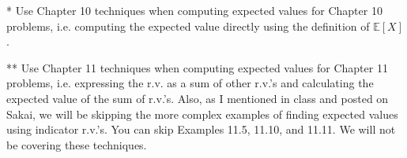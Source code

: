 \documentclass[12pt]{article}
\begin{document}
%
%
%

%
%
%




* Use Chapter 10 techniques when computing expected values for Chapter 10 problems, i.e. computing the expected value directly using the definition of $\mathbb{E}[X]$.

** Use Chapter 11 techniques when computing expected values for Chapter 11 problems, i.e. expressing the r.v. as a sum of other r.v.'s and calculating the expected value of the sum of r.v.'s. \newline
Also, as I mentioned in class and posted on Sakai, we will  be skipping the more complex examples of finding expected values using indicator r.v.'s. You can skip Examples 11.5, 11.10, and 11.11. We will not be covering these techniques. 
\end{document}
